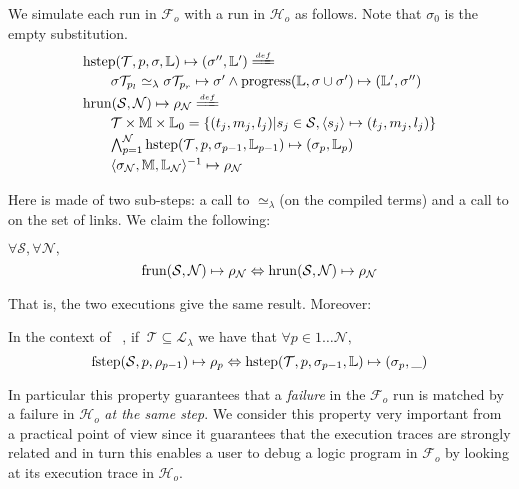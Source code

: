 \documentclass[sigconf,natbib=false,review]{acmart}
\newcommand{\UnifRel}{\ensuremath{\simeq}}
\newcommand{\Ue}{\ensuremath{\UnifRel_\lambda}\xspace}
\newcommand{\llambda}{\ensuremath{\mathcal{L}_\lambda}\xspace}
\newcommand{\Fo}{\ensuremath{\mathcal{F}_{\!o}\xspace}} %
\newcommand{\Ho}{\ensuremath{\mathcal{H}_o}\xspace}
\begin{document}
We simulate each run in \Fo{} with a run in \Ho as follows.
Note that $\sigma_0$ is the empty substitution.
$$
\begin{array}{l}
\stepH{\mathcal{T}}{p}{\sigma}{\linkStore}{\sigma''}{\linkStore'} \deff\vspace{2pt}\\
  \qquad\stepHD{\mathcal{T}}{p}{\sigma}{\sigma'}{\sigma''}{\linkStore}\vspace{2pt}\\
\runH{\mathcal{S}}{\mathcal{N}}{\rho} \deff \vspace{2pt}\\
  \qquad \mathcal{T} \times \mapStore \times \linkStore_0 = \{ (t_j,m_j,l_j) | s_j \in \mathcal{S}, \C{s_j}{t_j}{m_j}{l_j} \}\vspace{2pt}\\
  \qquad \runHD{\mathcal{T}}{\mathcal{N}}{\linkStore}\vspace{2pt}\\
  \qquad \D{\sigma_{\mathcal{N}}}{\mapStore}{\linkStore_{\mathcal{N}}}{\rho_{\mathcal{N}}}
\end{array}
$$

\noindent
Here \hstep{} is made of two sub-steps: a call to \Ue (on the compiled
terms) and a call to \progress{} on the set of links. We claim the following:

\begin{proposition}[Simulation]\label{prop:simulation}
$\forall \mathcal{S}, \forall \mathcal{N},$
$$
  \mathrm{frun}(\mathcal{S},\mathcal{N}) \mapsto \rho_{\mathcal{N}}
  \Leftrightarrow
  \mathrm{hrun}(\mathcal{S},\mathcal{N}) \mapsto \rho_{\mathcal{N}}
$$
\end{proposition}

\noindent
That is, the two executions give the same result. Moreover:

\begin{proposition}\label{prop:fidelity}
In the context of~ \hrun, if $~\mathcal{T} \subseteq \llambda$ we have that
$\forall p \in 1 \ldots \mathcal{N},$
$$
\mathrm{fstep}(\mathcal{S},p,\rho_{p-1}) \mapsto \rho_p
\Leftrightarrow
\mathrm{hstep}(\mathcal{T},p,\sigma_{p-1},\mathbb{L}) \mapsto (\sigma_p, \_)
$$
\end{proposition}
\noindent
In particular this property guarantees that a \emph{failure} in the \Fo{} run
is matched by a failure in \Ho{} \emph{at the same step}. We consider this
property very important from a practical point of view since it guarantees
that the execution traces are strongly related and in turn this enables a user
to debug a logic program in \Fo{} by looking at its execution trace in
\Ho{}.
\end{document}
